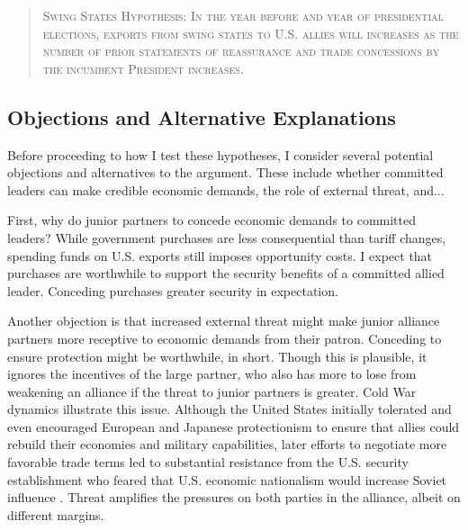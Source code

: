 \documentclass[12pt]{article}
\begin{document}
\begin{quote}
\textsc{Swing States Hypothesis: In the year before and year of presidential elections, exports from swing states to U.S. allies will increases as the number of prior statements of reassurance and trade concessions by the incumbent President increases.}
\end{quote}



\subsection{Objections and Alternative Explanations}


Before proceeding to how I test these hypotheses, I consider several potential objections and alternatives to the argument. 
These include whether committed leaders can make credible economic demands, the role of external threat, and... 


First, why do junior partners to concede economic demands to committed leaders? 
While government purchases are less consequential than tariff changes, spending funds on U.S. exports still imposes opportunity costs.
I expect that purchases are worthwhile to support the security benefits of a committed allied leader. 
Conceding purchases greater security in expectation. 


Another objection is that increased external threat might make junior alliance partners more receptive to economic demands from their patron.
Conceding to ensure protection might be worthwhile, in short.
Though this is plausible, it ignores the incentives of the large partner, who also has more to lose from weakening an alliance if the threat to junior partners is greater. 
Cold War dynamics illustrate this issue.
Although the United States initially tolerated and even encouraged European and Japanese protectionism to ensure that allies could rebuild their economies and military capabilities, later efforts to negotiate more favorable trade terms led to substantial resistance from the U.S. security establishment who feared that U.S. economic nationalism would increase Soviet influence \citep{Mastanduno1998}.
Threat amplifies the pressures on both parties in the alliance, albeit on different margins.






\singlespace
 
 
\end{document}
